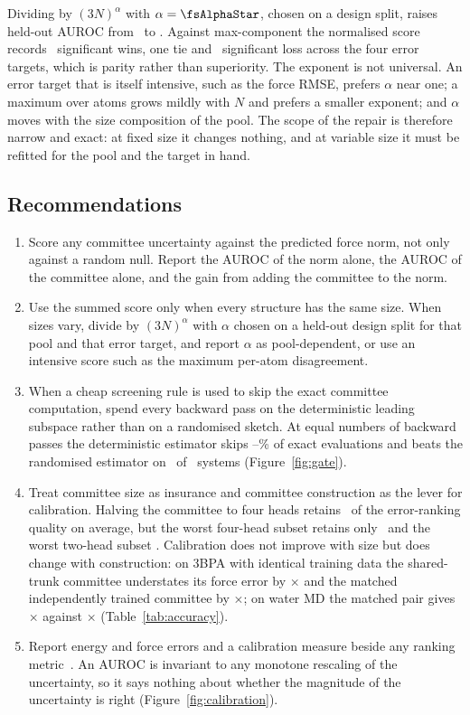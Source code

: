 Dividing by $(3N)^{\alpha}$ with $\alpha=\fsAlphaStar$, chosen on a design
split, raises held-out AUROC from \fsNormAurocZero\ to \fsNormAurocStar. Against
max-component the normalised score records \fsNormWins\ significant wins, one
tie and \fsNormLosses\ significant loss across the four error targets, which is
parity rather than superiority. The exponent is not universal. An error target
that is itself intensive, such as the force RMSE, prefers $\alpha$ near one; a
maximum over atoms grows mildly with $N$ and prefers a smaller exponent; and
$\alpha$ moves with the size composition of the pool. The scope of the repair is
therefore narrow and exact: at fixed size it changes nothing, and at variable
size it must be refitted for the pool and the target in hand.

\subsection{Recommendations}

\begin{enumerate}
\item Score any committee uncertainty against the predicted force norm, not
only against a random null. Report the AUROC of the norm alone, the AUROC of
the committee alone, and the gain from adding the committee to the norm.
\item Use the summed score only when every structure has the same size. When
sizes vary, divide by $(3N)^{\alpha}$ with $\alpha$ chosen on a held-out design
split for that pool and that error target, and report $\alpha$ as
pool-dependent, or use an intensive score such as the maximum per-atom
disagreement.
\item When a cheap screening rule is used to skip the exact committee
computation, spend every backward pass on the deterministic leading subspace
rather than on a randomised sketch. At equal numbers of backward passes the
deterministic estimator skips \fsLOSkipLoPct--\fsLOSkipHiPct\% of exact
evaluations and beats the randomised estimator on \fsLOBeatsCV\ of
\fsLOSystems\ systems (Figure~\ref{fig:gate}).
\item Treat committee size as insurance and committee construction as the lever
for calibration. Halving the committee to four heads retains \fsMFourRetained\
of the error-ranking quality on average, but the worst four-head subset retains
only \fsMFourWorstSubset\ and the worst two-head subset \fsMTwoWorstSubset.
Calibration does not improve with size but does change with construction: on
3BPA with identical training data the shared-trunk committee understates its
force error by \fsOverconfSharedSame$\times$ and the matched independently
trained committee by \fsOverconfNaiveSame$\times$; on water MD the matched pair
gives \fsOverconfSharedWaterMD$\times$ against \fsOverconfNaiveWaterMD$\times$
(Table~\ref{tab:accuracy}).
\item Report energy and force errors and a calibration measure beside any
ranking metric~\citep{tran2020methods,pernot2022long}. An AUROC is invariant to
any monotone rescaling of the uncertainty, so it says nothing about whether the
magnitude of the uncertainty is right (Figure~\ref{fig:calibration}).
\end{enumerate}

